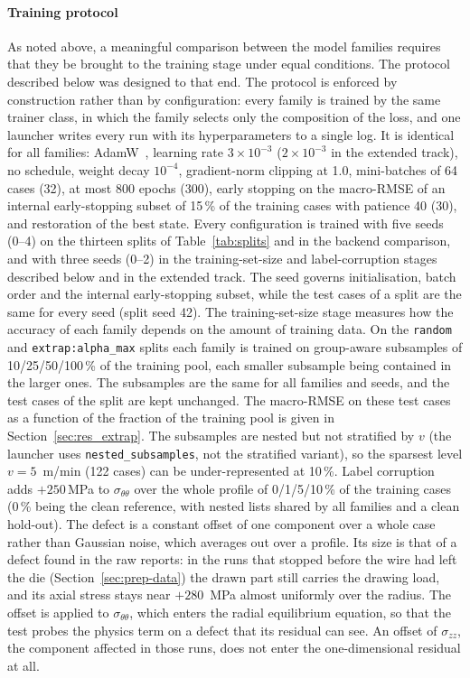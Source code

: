 \documentclass[pdflatex,sn-basic,Numbered]{sn-jnl}
\begin{document}
\paragraph{Training protocol}
As noted above, a meaningful comparison between the model families requires
that they be brought to the training stage under equal conditions. The protocol
described below was designed to that end.
The protocol is enforced by construction rather than by configuration: every
family is trained by the same trainer class, in which the family selects only the
composition of the loss, and one launcher writes every run with its
hyperparameters to a single log.
It is identical for all families: AdamW~\citep{loshchilov2019adamw}, learning rate
$3\times10^{-3}$ ($2\times10^{-3}$ in the extended track), no schedule, weight
decay $10^{-4}$, gradient-norm clipping at 1.0, mini-batches of 64 cases (32),
at most 800 epochs (300), early stopping on the macro-RMSE of an internal
early-stopping subset of 15\,\% of the training cases with patience 40 (30), and
restoration of the best state.
Every configuration is trained with five seeds (0--4) on the thirteen splits of
Table~\ref{tab:splits} and in the backend comparison, and with three seeds (0--2)
in the training-set-size and label-corruption stages described below and in the
extended track.
The seed governs initialisation, batch order and the internal early-stopping subset,
while the test cases of a split are the same for every seed (split seed 42).
The training-set-size stage measures how the accuracy of each family depends on
the amount of training data. On the \texttt{random} and
\texttt{extrap:alpha\_max} splits each family is trained on group-aware
subsamples of 10/25/50/100\,\% of the training pool, each smaller subsample
being contained in the larger ones. The subsamples are the same for all
families and seeds, and the test cases of the split are kept unchanged. The
macro-RMSE on these test cases as a function of the fraction of the training
pool is given in Section~\ref{sec:res_extrap}.
The subsamples are nested but not stratified by $v$ (the launcher uses
\texttt{nested\_subsamples}, not the stratified variant), so the sparsest level
$v = 5$~m/min (122 cases) can be under-represented at 10\,\%.
Label corruption adds $+250$\,MPa to $\sigma_{\theta\theta}$ over the whole profile of 0/1/5/10\,\% of
the training cases (0\,\% being the clean reference, with nested lists shared by all
families and a clean hold-out). The defect is a constant offset of one component over a whole case rather than Gaussian noise, which averages out over a profile. Its size is that of a defect found in the raw reports: in the runs that stopped before the wire had left the die (Section~\ref{sec:prep-data}) the drawn part still carries the drawing load, and its axial stress stays near $+280$~MPa almost uniformly over the radius. The offset is applied to $\sigma_{\theta\theta}$, which enters the radial equilibrium equation, so that the test probes the physics term on a defect that its residual can see. An offset of $\sigma_{zz}$, the component affected in those runs, does not enter the one-dimensional residual at all.
\end{document}
